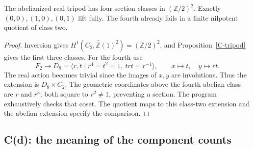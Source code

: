 \begin{proposition}
\label{C-tripod-class-two}
The abelianized real tripod has four section classes
in $(\mathbb Z/2)^2$. Exactly
$(0,0),(1,0),(0,1)$ lift fully. The fourth already
fails in a finite nilpotent quotient of class two.
\end{proposition}
\begin{proof}
Inversion gives $H^1(C_2,\widehat{\mathbb Z}(1)^2)
=(\mathbb Z/2)^2$, and Proposition~\ref{C-tripod}
gives the first three classes. For the fourth use
\[
 F_2\longrightarrow
 D_8=\langle r,t\mid r^4=t^2=1,\ trt=r^{-1}\rangle,
 \qquad x\mapsto t,\quad y\mapsto rt .
\]
The real action becomes trivial since the images
of $x,y$ are involutions. Thus the extension is
$D_8\times C_2$. The geometric coordinates above
the fourth abelian class are $r$ and $r^3$;
both square to $r^2\ne1$, preventing a section.
The program exhaustively checks that coset.
The quotient maps to this class-two extension
and the abelian extension specify the comparison.
\end{proof}

\subsection{C(d): the meaning of the component counts}

